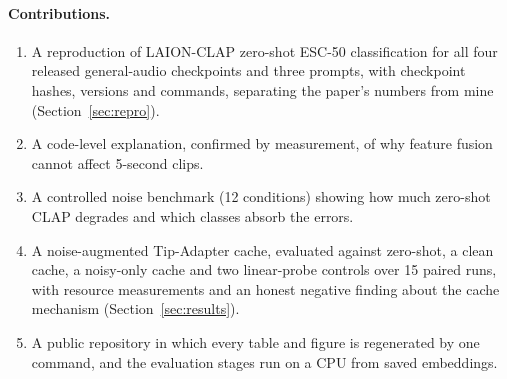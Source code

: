 \paragraph{Contributions.}
\begin{enumerate}\itemsep0pt
\item A reproduction of LAION-CLAP zero-shot ESC-50 classification for all four released general-audio checkpoints and three prompts, with checkpoint hashes, versions and commands, separating the paper's numbers from mine (Section~\ref{sec:repro}).
\item A code-level explanation, confirmed by measurement, of why feature fusion cannot affect 5-second clips.
\item A controlled noise benchmark (12 conditions) showing how much zero-shot CLAP degrades and which classes absorb the errors.
\item A noise-augmented Tip-Adapter cache, evaluated against zero-shot, a clean cache, a noisy-only cache and two linear-probe controls over 15 paired runs, with resource measurements and an honest negative finding about the cache mechanism (Section~\ref{sec:results}).
\item A public repository in which every table and figure is regenerated by one command, and the evaluation stages run on a CPU from saved embeddings.
\end{enumerate}
